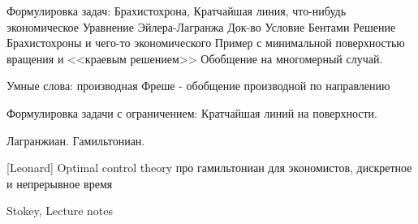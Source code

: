 









Формулировка задач:
Брахистохрона, Кратчайшая линия, что-нибудь экономическое
Уравнение Эйлера-Лагранжа
Док-во
Условие Бентами
Решение Брахистохроны и чего-то экономического
Пример с минимальной поверхностью вращения и <<краевым решением>>
Обобщение на многомерный случай.

Умные слова: производная Фреше - обобщение производной по направлению

Формулировка задачи с ограничением:
Кратчайшая линий на поверхности.


Лагранжиан. Гамильтониан.


[Leonard] Optimal control theory
про гамильтониан для экономистов, дискретное и непрерывное время

Stokey, Lecture notes
